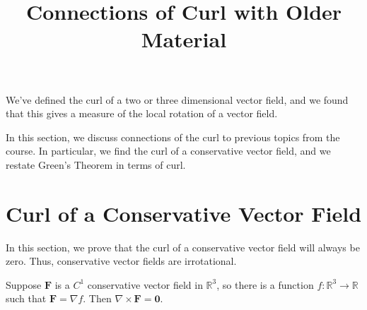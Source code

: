 \documentclass{ximera}
\title{Connections of Curl with Older Material}
\begin{document}
  
\begin{abstract}  
\end{abstract}  
\maketitle 

We've defined the curl of a two or three dimensional vector field, and we found that this gives a measure of the local rotation of a vector field.

In this section, we discuss connections of the curl to previous topics from the course. In particular, we find the curl of a conservative vector field, and we restate Green's Theorem in terms of curl.

\section*{Curl of a Conservative Vector Field}

In this section, we prove that the curl of a conservative vector field will always be zero. Thus, conservative vector fields are irrotational.

\begin{theorem}
Suppose $\mathbf{F}$ is a $C^1$ conservative vector field in $\mathbb{R}^3$, so there is a function $f:\mathbb{R}^3\rightarrow\mathbb{R}$ such that $\mathbf{F}=\nabla f$. Then $\nabla\times\mathbf{F} = \mathbf{0}$.
\end{theorem}
\end{document}

